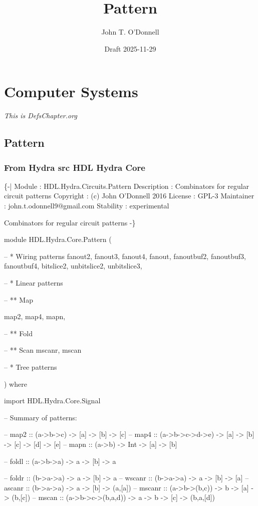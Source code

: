 \documentclass[]{svmono}
\author{John T. O'Donnell}
\date{Draft 2025-11-29}
\title{Pattern}
\begin{document}
\maketitle
\setcounter{tocdepth}{6}
\tableofcontents

\setlength\evensidemargin{25pt}
\setlength\oddsidemargin{25pt}
\part*{Computer Systems}
\label{sec:org740fd4d}

\emph{This is DefsChapter.org}
\chapter*{Pattern}
\label{sec:orgb1ea0aa}


\section*{From Hydra src HDL Hydra Core}
\label{sec:org6aee0a1}

\{-|
Module       : HDL.Hydra.Circuits.Pattern
Description  : Combinators for regular circuit patterns
Copyright    : (c) John O'Donnell 2016
License      : GPL-3
Maintainer   : john.t.odonnell9@gmail.com
Stability    : experimental

Combinators for regular circuit patterns -\}

module HDL.Hydra.Core.Pattern
  (

-- * Wiring patterns
   fanout2, fanout3, fanout4, fanout,
   fanoutbuf2, fanoutbuf3, fanoutbuf4,
   bitslice2, unbitslice2, unbitslice3,

-- * Linear patterns

-- ** Map

map2, map4, mapn,

-- ** Fold

-- ** Scan
   mscanr, mscan

-- * Tree patterns

) where

import HDL.Hydra.Core.Signal

-- Summary of patterns:

-- map2   :: (a->b->c) -> [a] -> [b] -> [c]
-- map4   :: (a->b->c->d->e) -> [a] -> [b] -> [c] -> [d] -> [e]
-- mapn   :: (a->b) -> Int -> [a] -> [b]

-- foldl  :: (a->b->a) -> a -> [b] -> a

-- foldr  :: (b->a->a) -> a -> [b] -> a
-- wscanr :: (b->a->a) -> a -> [b] -> [a]
-- ascanr :: (b->a->a) -> a -> [b] -> (a,[a])
-- mscanr :: (a->b->(b,c)) -> b -> [a] -> (b,[c])
-- mscan  :: (a->b->c->(b,a,d)) -> a -> b -> [c] -> (b,a,[d])
\end{document}
